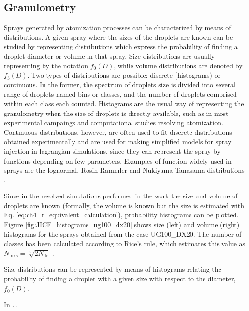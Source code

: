 \subsection{Granulometry}

Sprays generated by atomization processes can be characterized by means of distributions. A given spray where the sizes of the droplets are known can be studied by representing distributions which express the probability of finding a droplet diameter or volume in that spray. Size distributions are usually representing by the notation $f_0 \left( D \right)$, while volume distributions are denoted by $f_3 \left( D \right)$. Two types of distributions are possible: discrete (histograms) or continuous. In the former, the spectrum of droplets size is divided into several range of droplets named bins or classes, and the number of droplets comprised within each class each counted. Histograms are the usual way of representing the granulometry when the size of droplets is directly available, such as in most experimental campaings and computational studies resolving atomization. Continuous distributions, however, are often used to fit discrete distributions obtained experimentally and are used for making simplified models for spray injection in lagrangian simulations, since they can represent the spray by functions depending on few parameters. Examples of function widely used in sprays are the lognormal, Rosin-Rammler and Nukiyama-Tanasama distributions . 

Since in the resolved simulations performed in the work the size and volume of droplets are known (formally, the volume is known but the size is estimated with Eq. \ref{eq:ch4_r_equivalent_calculation}), probability histograms can be plotted. Figure \ref{fig:JICF_histograms_ug100_dx20} shows size (left) and volume (right) histograms for the sprays obtained from the case UG100\_DX20. The number of classes has been calculated according to Rice's rule, which estimates this value as $N_\mathrm{bins} = \sqrt[3]{2 N_\mathrm{dr}}$ .




Size distributions can be represented by means of histograms relating the probability of finding a droplet with a given size with respect to the diameter, $f_0 \left( D \right)$.



In  ...



